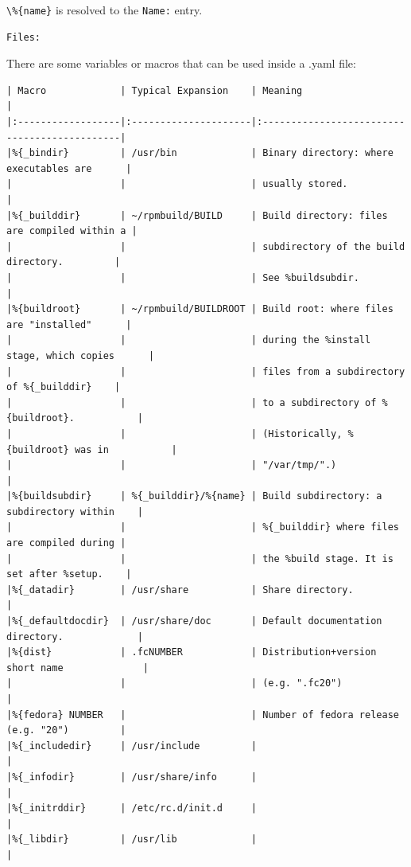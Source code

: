 \verb,\%{name}, is resolved to the \verb,Name:, entry.
\begin{lstlisting}[language=tex]
Files:
\end{lstlisting}
%
There are some variables or macros that can be used inside a .yaml file\cite{yaml02}:
%
\begin{lstlisting}[language=clean,basicstyle=\ttfamily\tiny]
| Macro             | Typical Expansion    | Meaning                                      |
|:------------------|:---------------------|:---------------------------------------------|
|%{_bindir}	        | /usr/bin	           | Binary directory: where executables are      |
|                   |                      | usually stored.                              |
|%{_builddir}       | ~/rpmbuild/BUILD	   | Build directory: files are compiled within a |
|                   |                      | subdirectory of the build directory.         |
|                   |                      | See %buildsubdir.                            |
|%{buildroot}       | ~/rpmbuild/BUILDROOT | Build root: where files are "installed"      |
|                   |                      | during the %install stage, which copies      |
|                   |                      | files from a subdirectory of %{_builddir}    |
|                   |                      | to a subdirectory of %{buildroot}.           |
|                   |                      | (Historically, %{buildroot} was in           |
|                   |                      | "/var/tmp/".)                                |
|%{buildsubdir}	    | %{_builddir}/%{name} | Build subdirectory: a subdirectory within    |
|                   |                      | %{_builddir} where files are compiled during |
|                   |                      | the %build stage. It is set after %setup.    |
|%{_datadir}        | /usr/share           | Share directory.                             |
|%{_defaultdocdir}  | /usr/share/doc       | Default documentation directory.             |
|%{dist}            | .fcNUMBER	           | Distribution+version short name              |
|                   |                      | (e.g. ".fc20")                               |
|%{fedora} NUMBER   |                      | Number of fedora release (e.g. "20")         |
|%{_includedir}	    | /usr/include         |                                              |
|%{_infodir}        | /usr/share/info      |                                              |
|%{_initrddir}      | /etc/rc.d/init.d     |                                              |
|%{_libdir}	        | /usr/lib             |                                              |

\end{lstlisting}
